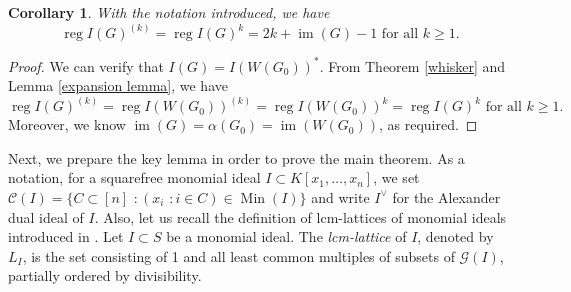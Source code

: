 \documentclass[12pt]{amsart}
\newtheorem{cor}[thm]{Corollary}
\theoremstyle{definition}
\theoremstyle{remark}
\DeclareMathOperator{\reg}{reg}
\DeclareMathOperator{\im}{im}
\DeclareMathOperator{\Min}{Min}
\begin{document}
\begin{cor}\label{multi-whisker}
With the notation introduced, we have  
$$\reg I(G)^{(k)}=\reg I(G)^{k}=2k+\im(G)-1\mbox{ for all }k\geq1.$$
\end{cor}
\begin{proof}
 We can verify that $I(G)=I(W(G_{0}))^{*}$. From Theorem \ref{whisker} and Lemma \ref{expansion lemma}, we have 
$$\reg I(G)^{(k)}=\reg I(W(G_{0}))^{(k)}=\reg I(W(G_{0}))^{k}=\reg I(G)^{k}\mbox{ for all }k\geq1.$$
Moreover, we know $\im(G)=\alpha(G_{0})=\im(W(G_{0}))$, as required. 
\end{proof}

Next, we prepare the key lemma in order to prove the main theorem. As a notation, for a squarefree monomial ideal $I\subset K[x_{1},\ldots, x_{n}]$, we set 
$\mathcal{C}(I)=\{C\subset[n]\,\,: (x_{i}\,\,: i\in C)\in\Min(I)\}$ and write $I^{\vee}$ for the Alexander dual ideal of $I$. Also, let us recall the definition of lcm-lattices of monomial ideals introduced in \cite{gpw1999}. Let $I\subset S$ be a monomial ideal. The {\it lcm-lattice} of $I$, denoted by $L_{I}$, is the set consisting of 1 and all least common multiples of subsets of $\mathcal{G}(I)$, partially ordered by divisibility. 
\end{document}
